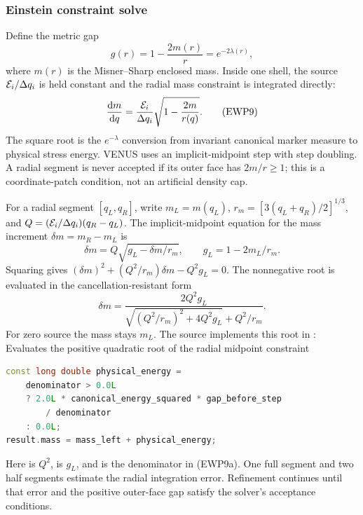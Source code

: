 \subsubsection{Einstein constraint solve}

Define the metric gap
\[
 g(r)=1-\frac{2m(r)}{r}=e^{-2\lambda(r)},                \tag{EWP8}
\]
where \(m(r)\) is the Misner--Sharp enclosed mass.  Inside one shell, the
source \({\cal E}_i/\Delta q_i\) is held constant and the radial mass
constraint is integrated directly:
\[
 \frac{\mathrm d m}{\mathrm d q}
 =\frac{{\cal E}_i}{\Delta q_i}
  \sqrt{1-\frac{2m}{r(q)}}.                              \tag{EWP9}
\]
The square root is the \(e^{-\lambda}\) conversion from invariant canonical
marker measure to physical stress energy.  VENUS uses an implicit-midpoint
step with step doubling.  A radial segment is never accepted if its outer
face has \(2m/r\ge1\); this is a coordinate-patch condition, not an artificial
density cap.

For a radial segment \([q_L,q_R]\), write \(m_L=m(q_L)\),
\(r_m=[3(q_L+q_R)/2]^{1/3}\), and
\(Q=({\cal E}_i/\Delta q_i)(q_R-q_L)\).  The implicit-midpoint equation
for the mass increment \(\delta m=m_R-m_L\) is
\[
 \delta m=Q\sqrt{g_L-\delta m/r_m},\qquad
 g_L=1-2m_L/r_m.
\]
Squaring gives \((\delta m)^2+(Q^2/r_m)\delta m-Q^2g_L=0\).
The nonnegative root is evaluated in the cancellation-resistant form
\[
 \delta m=\frac{2Q^2g_L}
 {\sqrt{(Q^2/r_m)^2+4Q^2g_L}+Q^2/r_m}.       \tag{EWP9a}
\]
For zero source the mass stays \(m_L\).  The source implements this root
in :
{}
{Evaluates the positive quadratic root of the radial midpoint constraint}
\begin{lstlisting}[language=C++]
const long double physical_energy =
    denominator > 0.0L
    ? 2.0L * canonical_energy_squared * gap_before_step
        / denominator
    : 0.0L;
result.mass = mass_left + physical_energy;
\end{lstlisting}
Here  is \(Q^2\),
 is \(g_L\), and  is the
denominator in (EWP9a).  One full segment and two half segments estimate the
radial integration error.  Refinement continues until that error and the
positive outer-face gap satisfy the solver's acceptance conditions.

